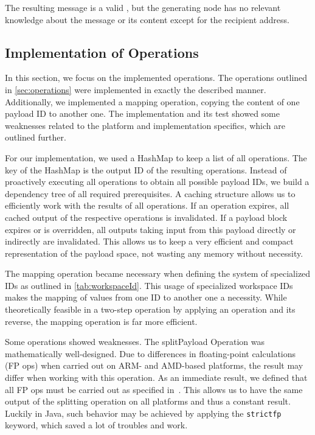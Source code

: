 The resulting message is a valid \VortexMessage, but the generating node has no relevant knowledge about the message or its content except for the recipient address. %

\subsection{Implementation of Operations\label{sec:implOperations}}
In this section, we focus on the implemented operations. The operations outlined in \cref{sec:operations} were implemented in exactly the described manner. Additionally, we implemented a mapping operation, copying the content of one payload ID to another one. The implementation and its test showed some weaknesses related to the platform and implementation specifics, which are outlined further.

For our implementation, we used a HashMap to keep a list of all operations. The key of the HashMap is the output ID of the resulting operations. Instead of proactively executing all operations to obtain all possible payload IDs, we build a dependency tree of all required prerequisites. A caching structure allows us to efficiently work with the results of all operations. If an operation expires, all cached output of the respective operations is invalidated. If a payload block expires or is overridden, all outputs taking input from this payload directly or indirectly are invalidated. This allows us to keep a very efficient and compact representation of the payload space, not wasting any memory without necessity.

The mapping operation became necessary when defining the system of specialized IDs as outlined in \cref{tab:workspaceId}. This usage of specialized workspace IDs makes the mapping of values from one ID to another one a necessity. While theoretically feasible in a two-step operation by applying an operation and its reverse, the mapping operation is far more efficient.

Some operations showed weaknesses. The splitPayload Operation was mathematically well-designed. Due to differences in floating-point calculations (FP ops) when carried out on ARM- and AMD-based platforms, the result may differ when working with this operation. As an immediate result, we defined that all FP ops must be carried out as specified in~\cite{IEEE754}. This allows us to have the same output of the splitting operation on all platforms and thus a constant result. Luckily in Java, such behavior may be achieved by applying the \lstinline[columns=fixed,basicstyle={\normalsize}]{strictfp} keyword, which saved a lot of troubles and work.

